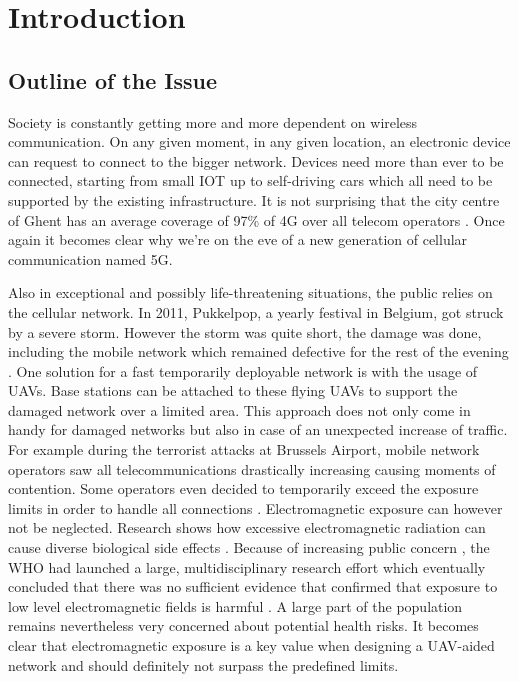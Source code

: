 \chapter{Introduction}
\label{chap:intro}

\section{Outline of the Issue} %
\label{sec:issue}

Society is constantly getting more and more dependent on wireless communication. 
On any given moment, in any given location, an electronic device
can request to connect to the bigger network. Devices need more than ever to be connected, 
starting from small \gls{IOT} up to self-driving cars
which all need to be supported by the existing infrastructure. 
It is not surprising that the city centre of Ghent has an average coverage of 97\% of 4G over all telecom operators
\cite{testaankoop}. Once again it becomes clear why we're on the eve of a new generation of cellular communication named 5G. 

Also in exceptional and possibly life-threatening situations, the public relies on the cellular network. 
In 2011, Pukkelpop, a yearly festival in Belgium, got struck by a severe storm. However the storm 
was quite short, the damage was done, including the mobile network which remained defective for the rest of the evening \cite{pukkelpop}.
One solution for a fast temporarily deployable network is with the usage of \gls{UAV}s. Base stations can be attached to 
these flying \gls{UAV}s to support the damaged network over a limited area. 
This approach does not only come in handy for 
damaged networks but also in case of an unexpected increase of traffic. 
For example during the terrorist attacks at Brussels Airport,
mobile network operators saw all telecommunications drastically increasing causing moments of contention. 
Some operators even decided to temporarily exceed the exposure limits in
order to handle all connections \cite{baseZaventem}.
Electromagnetic exposure can however not be neglected. Research shows how excessive electromagnetic radiation can cause diverse biological side effects \cite{bioeffects}.
Because of increasing public concern \cite{J31_bioeffects}, the \gls{WHO} had launched a large, multidisciplinary research effort which eventually concluded that there was no sufficient evidence that confirmed 
that exposure to low level electromagnetic fields is harmful \cite{WHO}. 
A large part of the population remains nevertheless very concerned about potential health risks.
It becomes clear that electromagnetic exposure is a key value when designing a \gls{UAV}-aided network and should definitely 
not surpass the predefined limits.

